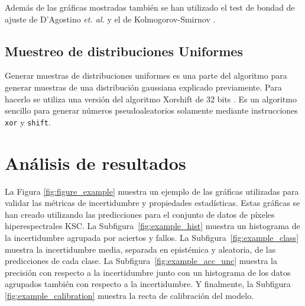 Además de las gráficas mostradas también se han utilizado el test de bondad de ajuste de D’Agostino \emph{et. al.} \cite{normaltest_1, normaltest_2} y el de Kolmogorov-Smirnov \cite{kstest}.

\subsection{Muestreo de distribuciones Uniformes}

Generar muestras de distribuciones uniformes es una parte del algoritmo para generar muestras de una distribución gaussiana explicado previamente. Para hacerlo se utiliza una versión del algoritmo Xorshift de 32 bits \cite{xorshift}. Es un algoritmo sencillo para generar números pseudoaleatorios solamente mediante instrucciones \texttt{xor} y \texttt{shift}.

\section{Análisis de resultados} \label{sec:uncertainty_example}

La Figura \ref{fig:figure_example} muestra un ejemplo de las gráficas utilizadas para validar las métricas de incertidumbre y propiedades estadísticas. Estas gráficas se han creado utilizando las predicciones para el conjunto de datos de píxeles hiperespectrales KSC. La Subfigura~\ref{fig:example_hist} muestra un histograma de la incertidumbre agrupada por aciertos y fallos. La Subfigura~\ref{fig:example_class} muestra la incertidumbre media, separada en epistémica y aleatoria, de las predicciones de cada clase. La Subfigura~\ref{fig:example_acc_unc} muestra la precisión con respecto a la incertidumbre junto con un histograma de los datos agrupados también con respecto a la incertidumbre. Y finalmente, la Subfigura~ \ref{fig:example_calibration} muestra la recta de calibración del modelo.

